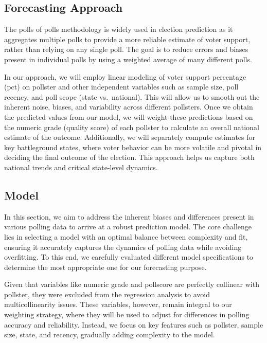 \documentclass[
  letterpaper,
  DIV=11,
  numbers=noendperiod]{scrartcl}
\begin{document}
\hypertarget{forecasting-approach}{%
\subsection{Forecasting Approach}\label{forecasting-approach}}

The polls of polls methodology is widely used in election prediction as
it aggregates multiple polls to provide a more reliable estimate of
voter support, rather than relying on any single poll. The goal is to
reduce errors and biases present in individual polls by using a weighted
average of many different polls.

In our approach, we will employ linear modeling of voter support
percentage (pct) on pollster and other independent variables such as
sample size, poll recency, and poll scope (state vs.~national). This
will allow us to smooth out the inherent noise, biases, and variability
across different pollsters. Once we obtain the predicted values from our
model, we will weight these predictions based on the numeric grade
(quality score) of each pollster to calculate an overall national
estimate of the outcome. Additionally, we will separately compute
estimates for key battleground states, where voter behavior can be more
volatile and pivotal in deciding the final outcome of the election. This
approach helps us capture both national trends and critical state-level
dynamics.

\hypertarget{model}{%
\subsection{Model}\label{model}}

In this section, we aim to address the inherent biases and differences
present in various polling data to arrive at a robust prediction model.
The core challenge lies in selecting a model with an optimal balance
between complexity and fit, ensuring it accurately captures the dynamics
of polling data while avoiding overfitting. To this end, we carefully
evaluated different model specifications to determine the most
appropriate one for our forecasting purpose.

Given that variables like numeric grade and pollscore are perfectly
collinear with pollster, they were excluded from the regression analysis
to avoid multicollinearity issues. These variables, however, remain
integral to our weighting strategy, where they will be used to adjust
for differences in polling accuracy and reliability. Instead, we focus
on key features such as pollster, sample size, state, and recency,
gradually adding complexity to the model.
\end{document}
